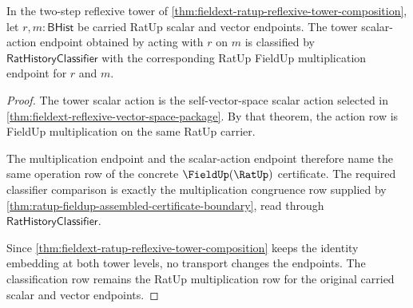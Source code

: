 \begin{theorem}
\label{thm:fieldext-ratup-reflexive-tower-scalar-action}
In the two-step reflexive tower of
\autoref{thm:fieldext-ratup-reflexive-tower-composition}, let
$r,m:\mathsf{BHist}$ be carried RatUp scalar and vector endpoints. The tower
scalar-action endpoint obtained by acting with $r$ on $m$ is classified by
$\mathsf{RatHistoryClassifier}$ with the corresponding RatUp FieldUp
multiplication endpoint for $r$ and $m$.
\end{theorem}
\begin{proof}
The tower scalar action is the self-vector-space scalar action selected in
\autoref{thm:fieldext-reflexive-vector-space-package}. By that theorem, the
action row is FieldUp multiplication on the same RatUp carrier.

The multiplication endpoint and the scalar-action endpoint therefore name the
same operation row of the concrete $\FieldUp(\RatUp)$ certificate. The required
classifier comparison is exactly the multiplication congruence row supplied by
\autoref{thm:ratup-fieldup-assembled-certificate-boundary}, read through
$\mathsf{RatHistoryClassifier}$.

Since
\autoref{thm:fieldext-ratup-reflexive-tower-composition} keeps the identity
embedding at both tower levels, no transport changes the endpoints. The
classification row remains the RatUp multiplication row for the original
carried scalar and vector endpoints.
\end{proof}

